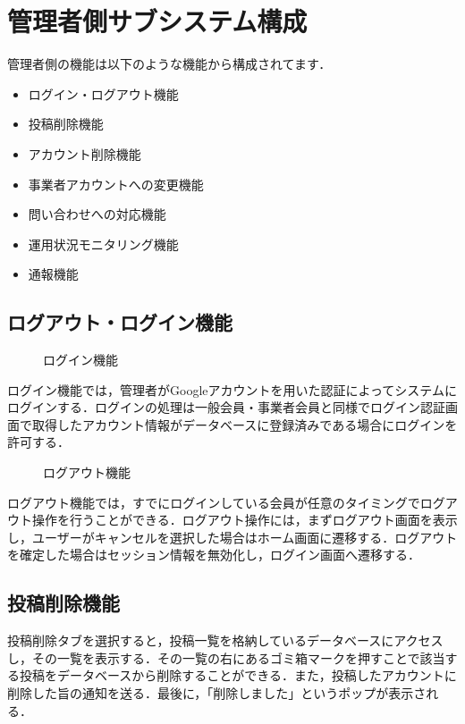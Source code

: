 \section{管理者側サブシステム構成}
管理者側の機能は以下のような機能から構成されてます．

\begin{itemize}
    \item ログイン・ログアウト機能
    \item 投稿削除機能
    \item アカウント削除機能
    \item 事業者アカウントへの変更機能
    \item 問い合わせへの対応機能
    \item 運用状況モニタリング機能
    \item 通報機能
\end{itemize}

\subsection{ログアウト・ログイン機能}
\begin{figure}[H]
    \centering
    
    \caption{ログイン機能}
    \label{fig:admin_login}
\end{figure}

ログイン機能では，管理者がGoogleアカウントを用いた認証によってシステムにログインする．ログインの処理は一般会員・事業者会員と同様でログイン認証画面で取得したアカウント情報がデータベースに登録済みである場合にログインを許可する．

\begin{figure}[H]
    \centering
    
    \caption{ログアウト機能}
    \label{fig:admin_logout}
\end{figure}
ログアウト機能では，すでにログインしている会員が任意のタイミングでログアウト操作を行うことができる．ログアウト操作には，まずログアウト画面を表示し，ユーザーがキャンセルを選択した場合はホーム画面に遷移する．ログアウトを確定した場合はセッション情報を無効化し，ログイン画面へ遷移する．

\subsection{投稿削除機能}
投稿削除タブを選択すると，投稿一覧を格納しているデータベースにアクセスし，その一覧を表示する．その一覧の右にあるゴミ箱マークを押すことで該当する投稿をデータベースから削除することができる．また，投稿したアカウントに削除した旨の通知を送る．最後に，「削除しました」というポップが表示される．

